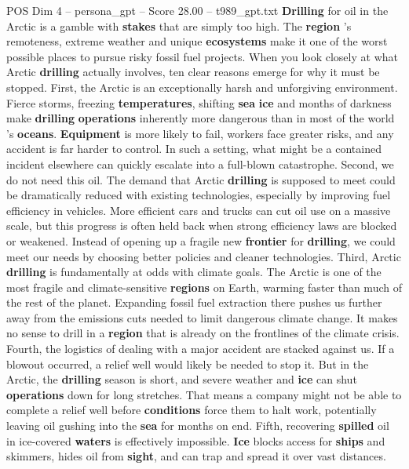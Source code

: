 \begin{textsample}{POS Dim 4 – persona\_gpt – Score 28.00 – t989\_gpt.txt}  \label{ex:f4_pos_027}
\textbf{Drilling} for oil in the Arctic is a gamble with \textbf{stakes} that are simply too high.
The \textbf{region} ’s remoteness, extreme weather and unique \textbf{ecosystems} make it one of the worst possible places to pursue risky fossil fuel projects.
When you look closely at what Arctic \textbf{drilling} actually involves, ten clear reasons emerge for why it must be stopped.
First, the Arctic is an exceptionally harsh and unforgiving environment.
Fierce storms, freezing \textbf{temperatures}, shifting \textbf{sea} \textbf{ice} and months of darkness make \textbf{drilling} \textbf{operations} inherently more dangerous than in most of the world ’s \textbf{oceans}. \textbf{Equipment} is more likely to fail, workers face greater risks, and any accident is far harder to control.
In such a setting, what might be a contained incident elsewhere can quickly escalate into a full-blown catastrophe.
Second, we do not need this oil.
The demand that Arctic \textbf{drilling} is supposed to meet could be dramatically reduced with existing technologies, especially by improving fuel efficiency in vehicles.
More efficient cars and trucks can cut oil use on a massive scale, but this progress is often held back when strong efficiency laws are blocked or weakened.
Instead of opening up a fragile new \textbf{frontier} for \textbf{drilling}, we could meet our needs by choosing better policies and cleaner technologies.
Third, Arctic \textbf{drilling} is fundamentally at odds with climate goals.
The Arctic is one of the most fragile and climate-sensitive \textbf{regions} on Earth, warming faster than much of the rest of the planet.
Expanding fossil fuel extraction there pushes us further away from the emissions cuts needed to limit dangerous climate change.
It makes no sense to drill in a \textbf{region} that is already on the frontlines of the climate crisis.
Fourth, the logistics of dealing with a major accident are stacked against us.
If a blowout occurred, a relief well would likely be needed to stop it.
But in the Arctic, the \textbf{drilling} season is short, and severe weather and \textbf{ice} can shut \textbf{operations} down for long stretches.
That means a company might not be able to complete a relief well before \textbf{conditions} force them to halt work, potentially leaving oil gushing into the \textbf{sea} for months on end.
Fifth, recovering \textbf{spilled} oil in ice-covered \textbf{waters} is effectively impossible. \textbf{Ice} blocks access for \textbf{ships} and skimmers, hides oil from \textbf{sight}, and can trap and spread it over vast distances.

\end{textsample}

